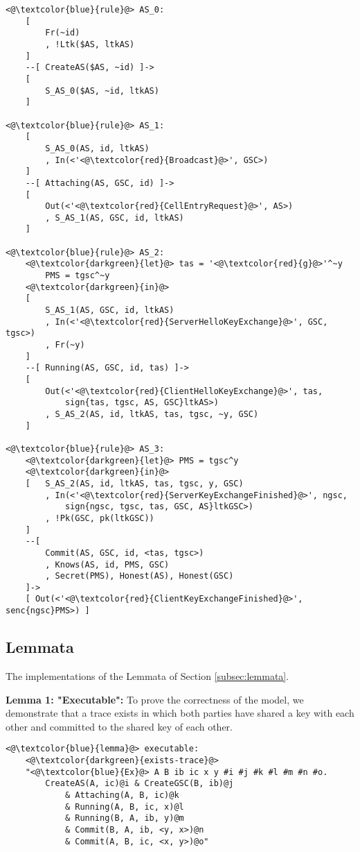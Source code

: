 \begin{lstlisting}
<@\textcolor{blue}{rule}@> AS_0:
    [ 
        Fr(~id)
        , !Ltk($AS, ltkAS)
    ]
    --[ CreateAS($AS, ~id) ]->
    [ 
        S_AS_0($AS, ~id, ltkAS) 
    ]

<@\textcolor{blue}{rule}@> AS_1:
    [   
        S_AS_0(AS, id, ltkAS)
        , In(<'<@\textcolor{red}{Broadcast}@>', GSC>)
    ]
    --[ Attaching(AS, GSC, id) ]->
    [
        Out(<'<@\textcolor{red}{CellEntryRequest}@>', AS>)
        , S_AS_1(AS, GSC, id, ltkAS)
    ]

<@\textcolor{blue}{rule}@> AS_2:
    <@\textcolor{darkgreen}{let}@> tas = '<@\textcolor{red}{g}@>'^~y
        PMS = tgsc^~y
    <@\textcolor{darkgreen}{in}@> 
    [   
        S_AS_1(AS, GSC, id, ltkAS)
        , In(<'<@\textcolor{red}{ServerHelloKeyExchange}@>', GSC, tgsc>)
        , Fr(~y)
    ]
    --[ Running(AS, GSC, id, tas) ]-> 
    [ 
        Out(<'<@\textcolor{red}{ClientHelloKeyExchange}@>', tas, 
            sign{tas, tgsc, AS, GSC}ltkAS>)
        , S_AS_2(AS, id, ltkAS, tas, tgsc, ~y, GSC) 
    ]

<@\textcolor{blue}{rule}@> AS_3:
    <@\textcolor{darkgreen}{let}@> PMS = tgsc^y
    <@\textcolor{darkgreen}{in}@> 
    [   S_AS_2(AS, id, ltkAS, tas, tgsc, y, GSC)  
        , In(<'<@\textcolor{red}{ServerKeyExchangeFinished}@>', ngsc, 
            sign{ngsc, tgsc, tas, GSC, AS}ltkGSC>)        
        , !Pk(GSC, pk(ltkGSC))
    ]
    --[ 
        Commit(AS, GSC, id, <tas, tgsc>)
        , Knows(AS, id, PMS, GSC)
        , Secret(PMS), Honest(AS), Honest(GSC) 
    ]->
    [ Out(<'<@\textcolor{red}{ClientKeyExchangeFinished}@>', senc{ngsc}PMS>) ]
\end{lstlisting}

\subsection{Lemmata}
The implementations of the Lemmata of Section \ref{subsec:lemmata}.

\vspace{0.5em}

\textbf{Lemma 1: "Executable":} To prove the correctness of the model, we demonstrate that a trace exists in which both parties have shared a key with each other and committed to the shared key of each other. 

\begin{lstlisting}
<@\textcolor{blue}{lemma}@> executable:
    <@\textcolor{darkgreen}{exists-trace}@> 
    "<@\textcolor{blue}{Ex}@> A B ib ic x y #i #j #k #l #m #n #o. 
        CreateAS(A, ic)@i & CreateGSC(B, ib)@j 
            & Attaching(A, B, ic)@k
            & Running(A, B, ic, x)@l 
            & Running(B, A, ib, y)@m 
            & Commit(B, A, ib, <y, x>)@n 
            & Commit(A, B, ic, <x, y>)@o"
\end{lstlisting}



